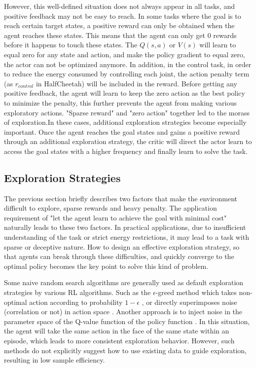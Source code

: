 However, this well-defined situation does not always appear in all tasks, and positive feedback may not be easy to reach. In some tasks where the goal is to reach certain target states, a positive reward can only be obtained when the agent reaches these states. This means that the agent can only get 0 rewards before it happens to touch these states. The $Q(s,a)$ or $V(s)$ will learn to equal zero for any state and action, and make the policy gradient to equal zero, the actor can not be optimized anymore. In addition, in the control task, in order to reduce the energy consumed by controlling each joint, the action penalty term (as $r_{control}$ in HalfCheetah) will be included in the reward. Before getting any positive feedback, the agent will learn to keep the zero action as the best policy to minimize the penalty, this further prevents the agent from making various exploratory actions. "Sparse reward" and "zero action" together led to the morass of exploration.In these cases, additional exploration strategies become especially important. Once the agent reaches the goal states and gains a positive reward through an additional exploration strategy, the critic will direct the actor learn to access the goal states with a higher frequency and finally learn to solve the task.

\subsection{Exploration Strategies}
The previous section briefly describes two factors that make the environment difficult to explore, sparse rewards and heavy penalty. The application requirement of "let the agent learn to achieve the goal with minimal cost" naturally leads to these two factors. In practical applications, due to insufficient understanding of the task or strict energy restrictions, it may lead to a task with sparse or deceptive nature. How to design an effective exploration strategy, so that agents can break through these difficulties, and quickly converge to the optimal policy becomes the key point to solve this kind of problem.

Some naive random search algorithms are generally used as default exploration strategies by various RL algorithms. Such as the $\epsilon$-greed method which takes non-optimal action according to probability $1-\epsilon$ \cite{DQN}, or directly superimposes noise (correlation or not) in action space \cite{DDPG}. Another approach is to inject noise in the parameter space of the Q-value function of the policy function \cite{pnoise}. In this situation, the agent will take the same action in the face of the same state within an episode, which leads to more consistent exploration behavior. However, such methods do not explicitly suggest how to use existing data to guide exploration, resulting in low sample efficiency. 

